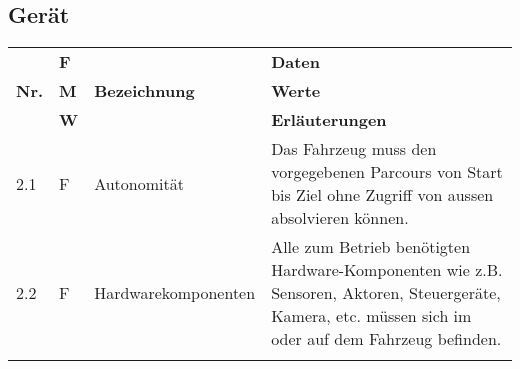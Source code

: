 \documentclass[main.tex]{subfiles} %
\begin{document}
\subsection{Gerät}
\begin{tabular}{|l|p{0.5cm}|p{4cm}|p{10cm}|}
  \hline
               & \textbf{F}            &                                                                       & \textbf{Daten}                                                                                                                                                                                                                                                                                                                             \\
  \textbf{Nr.} & \textbf{M}            & \textbf{Bezeichnung}                                                  & \textbf{Werte}                                                                                                                                                                                                                                                                                                                             \\
               & \textbf{W}            &                                                                       & \textbf{Erläuterungen}                                                                                                                                                                                                                                                                                                                     \\
  \hline
  2.1          & F                     & Autonomität                                                           & Das Fahrzeug muss den vorgegebenen Parcours von Start bis Ziel ohne Zugriff von aussen absolvieren können.                                                                                                                                                                                                                                  \\
  \hline
  2.2          & F                     & Hardwarekomponenten                                                   & Alle zum Betrieb benötigten Hardware-Komponenten wie z.B. Sensoren, Aktoren, Steuergeräte, Kamera, etc. müssen sich im oder auf dem Fahrzeug befinden.                                                                                                                                                                                     \\                                                                                                                                                                                                                                                                                                                                           \\

\end{tabular}
\end{document}
